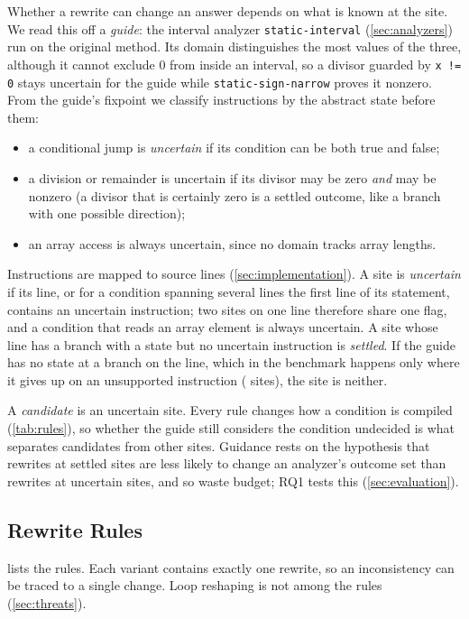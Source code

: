 Whether a rewrite can change an answer depends on what is known at the site.
We read this off a \emph{guide}: the interval analyzer \texttt{static-interval}
(\cref{sec:analyzers}) run on the original method. Its domain distinguishes the
most values of the three, although it cannot exclude 0 from inside an interval,
so a divisor guarded by \texttt{x != 0} stays uncertain for the guide while
\texttt{static-sign-narrow} proves it nonzero. From the guide's fixpoint we classify
instructions by the abstract state before them:
\begin{itemize}
  \item a conditional jump is \emph{uncertain} if its condition can be both
    true and false;
  \item a division or remainder is uncertain if its divisor may be zero
    \emph{and} may be nonzero (a divisor that is certainly zero is a settled
    outcome, like a branch with one possible direction);
  \item an array access is always uncertain, since no domain tracks array
    lengths.
\end{itemize}
Instructions are mapped to source lines (\cref{sec:implementation}). A site is
\emph{uncertain} if its line, or for a condition spanning several lines the
first line of its statement, contains an uncertain instruction; two sites on
one line therefore share one flag, and a condition that reads an array element
is always uncertain. A site whose line has a branch with a state but no
uncertain instruction is \emph{settled}. If the guide has no state at a branch
on the line, which in the benchmark happens only where it gives up on an
unsupported instruction (\NumNoState{} sites), the site is neither.

A \emph{candidate} is an uncertain site. Every rule changes how a condition is
compiled (\cref{tab:rules}), so whether the guide still considers the condition
undecided is what separates candidates from other sites. Guidance rests on the
hypothesis that rewrites at settled sites are less likely to change an
analyzer's outcome set than rewrites at uncertain sites, and so waste budget;
RQ1 tests this (\cref{sec:evaluation}).

\subsection{Rewrite Rules}
\label{sec:rules}
 lists the rules. Each variant contains exactly one rewrite, so
an inconsistency can be traced to a single change. Loop reshaping is not among
the rules (\cref{sec:threats}).

